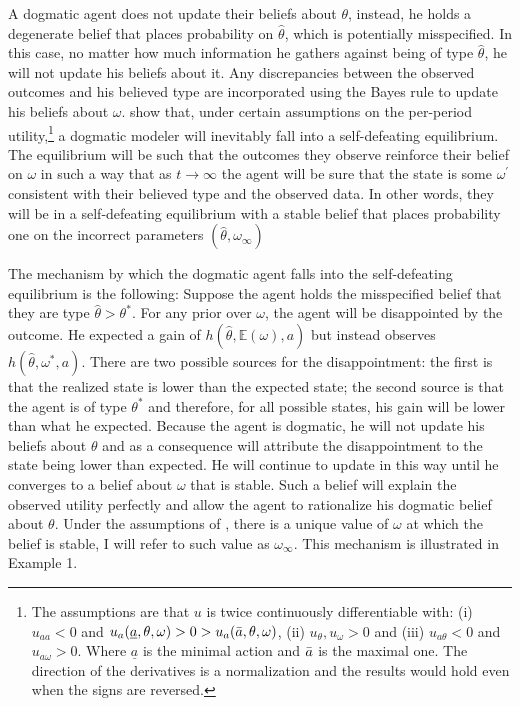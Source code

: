 \documentclass[
  12pt,
]{article}
\begin{document}
A dogmatic agent does not update their beliefs about \(\theta\),
instead, he holds a degenerate belief that places probability on
\(\hat{\theta}\), which is potentially misspecified. In this case, no
matter how much information he gathers against being of type
\(\hat{\theta}\), he will not update his beliefs about it. Any
discrepancies between the observed outcomes and his believed type are
incorporated using the Bayes rule to update his beliefs about
\(\omega\). \citet{Heidhues2018} show that, under certain assumptions on
the per-period utility,\footnote{The assumptions are that 
$u$ is twice continuously differentiable with: (i)$u_{aa}<0$ and $u_a(\underline{a},  \theta, \omega)>0>u_a(\Bar{a}, \theta, \omega)$, 
(ii) $u_{\theta}, u_{\omega}>0$ and (iii) $u_{a\theta}<0$ and $u_{a\omega}>0$. Where $\underline{a}$ is the
minimal action and $\Bar{a}$ is the maximal one. 
 The direction of the derivatives is a normalization
and the results would hold even when the signs are reversed.} a dogmatic
modeler will inevitably fall into a self-defeating equilibrium. The
equilibrium will be such that the outcomes they observe reinforce their
belief on \(\omega\) in such a way that as \(t\to\infty\) the agent will
be sure that the state is some \(\omega^{'}\) consistent with their
believed type and the observed data. In other words, they will be in a
self-defeating equilibrium with a stable belief that places probability
one on the incorrect parameters \((\hat{\theta}, \omega_{\infty})\)

The mechanism by which the dogmatic agent falls into the self-defeating
equilibrium is the following: Suppose the agent holds the misspecified
belief that they are type \(\hat{\theta}>\theta^*\). For any prior over
\(\omega\), the agent will be disappointed by the outcome. He expected a
gain of \(h(\hat{\theta}, \mathbb{E}(\omega), a)\) but instead observes
\(h(\hat{\theta}, \omega^*, a)\). There are two possible sources for the
disappointment: the first is that the realized state is lower than the
expected state; the second source is that the agent is of type
\(\theta^*\) and therefore, for all possible states, his gain will be
lower than what he expected. Because the agent is dogmatic, he will not
update his beliefs about \(\theta\) and as a consequence will attribute
the disappointment to the state being lower than expected. He will
continue to update in this way until he converges to a belief about
\(\omega\) that is stable. Such a belief will explain the observed
utility perfectly and allow the agent to rationalize his dogmatic belief
about \(\theta\). Under the assumptions of \citet{Heidhues2018}, there
is a unique value of \(\omega\) at which the belief is stable, I will
refer to such value as \(\omega_\infty\). This mechanism is illustrated
in Example 1.
\end{document}
